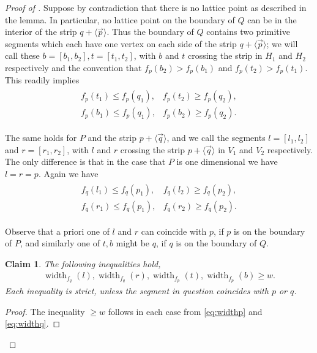 \documentclass{amsart}
\theoremstyle{plain}
\newtheorem{claim}[theorem]{Claim}
\theoremstyle{definition}
\newcommand{\width}{\operatorname{width}}
\renewcommand{\vec}[1]{\overrightarrow#1}
\newcommand{\vecline}[1]{\langle \vec #1 \rangle}
\begin{document}
\begin{proof}[Proof of ]
Suppose by contradiction that there is no lattice point as described in the lemma. In particular, no lattice point on the boundary of $Q$ can be in the interior of the strip $q + \vecline p$.  Thus the boundary of $Q$ contains two primitive segments which each have one vertex on each side of the strip $q + \vecline p$; we will call these  $b=[b_1, b_2], t=[t_1, t_2]$, with $b$ and $t$ crossing the strip in $H_1$ and $H_2$ respectively and the convention that $f_p(b_2) >f_p(b_1)$ and $f_p(t_2) >f_p(t_1)$. This readily implies 
\begin{gather}
\label{eq:widthq}
\begin{array}{cc}
f_p(t_1) \leq f_p(q_1), &
f_p(t_2) \geq f_p(q_2), \\
f_p(b_1) \leq f_p(q_1), &
f_p(b_2) \geq f_p(q_2).
\end{array}
\end{gather}


The same holds for $P$ and the strip $p+\vecline q$, and we call the segments 
$l=[l_1, l_2]$ and $r=[r_1, r_2]$, with $l$ and $r$ crossing the strip $p + \vecline q$  in $V_1$ and $ V_2$ respectively. The only difference is that in the case that $P$ is one dimensional we have $l=r=p$.  Again we have
\begin{gather}
\label{eq:widthp}
\begin{array}{cc}
f_q(l_1) \leq f_q(p_1), &
f_q(l_2) \geq f_q(p_2), \\
f_q(r_1) \leq f_q(p_1),&
f_q(r_2) \geq f_q(p_2).
\end{array}
\end{gather}

Observe that a priori one of $l$ and $r$ can coincide with $p$, if $p$ is on the boundary of $P$, and similarly one of $t,b$ might be $q$, if $q$ is on the boundary of $Q$. 


\begin{claim}\label{claim:width}
The following inequalities hold, 
\begin{align*}
\width_{f_q}(l) , 
\width_{f_q}(r) ,
\width_{f_p}(t) ,
\width_{f_p}(b) \geq w.
\end{align*}
Each inequality is strict, unless the segment in question coincides with $p$ or $q$.
\end{claim}

\begin{proof}
The inequality $\geq w$ follows in each case from \eqref{eq:widthp} and \eqref{eq:widthq}.


\end{proof}
\end{proof}
\end{document}
